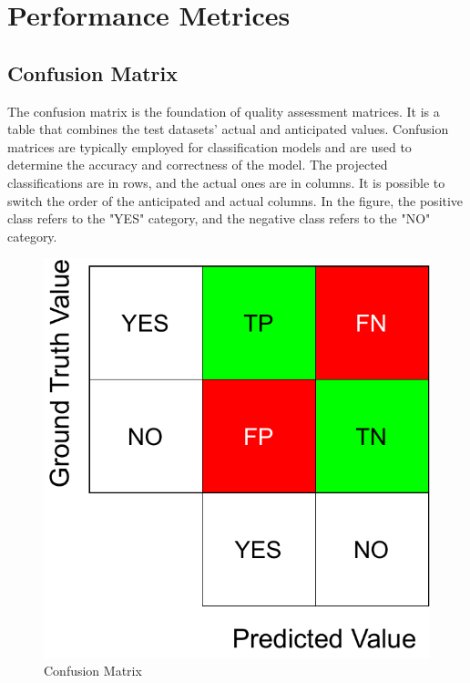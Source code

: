 \section{Performance Metrices}
\subsection{Confusion Matrix}
The confusion matrix is the foundation of quality assessment matrices. It is a table that combines the test datasets' actual and anticipated values. Confusion matrices are typically employed for classification models and are used to determine the accuracy and correctness of the model. The projected classifications are in rows, and the actual ones are in columns. It is possible to switch the order of the anticipated and actual columns. In the figure, the positive class refers to the "YES" category, and the negative class refers to the "NO" category.

\begin{figure}[htbp]
    \centering
    \includegraphics[width=0.5\linewidth]{97_graphics//related_work/conf_matrix.pdf}
    \caption{Confusion Matrix}
    \label{fig:related_work-conf_matrix}
\end{figure}


